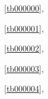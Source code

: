 ﻿



\noindent\tablename\ \ref{tb000000},\ \pageref{tb000000}%

\noindent\tablename\ \ref{tb000001},\ \pageref{tb000001}%

\noindent\tablename\ \ref{tb000002},\ \pageref{tb000002}%

\noindent\tablename\ \ref{tb000003},\ \pageref{tb000003}%

\noindent\tablename\ \ref{tb000004},\ \pageref{tb000004}%










